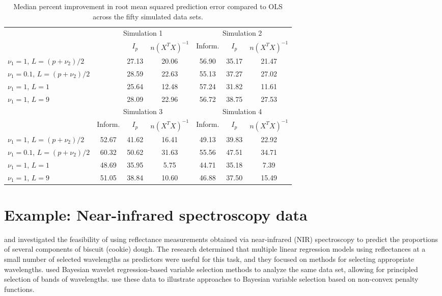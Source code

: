 \documentclass[12pt]{article}
\renewcommand{\baselinestretch}{1.85}
\begin{document}
\renewcommand{\baselinestretch}{1}
\begin{table}
	\begin{center}
\begin{tabular}{lcccccc}
  \toprule
  & \multicolumn{3}{c}{Simulation 1} & \multicolumn{3}{c}{Simulation 2} \\
  \cmidrule(lr){2-4} \cmidrule(lr){5-7} 
   &  & $I_p$ & $n(X^TX)^{-1}$ & Inform. & $I_p$ & $n(X^TX)^{-1}$ \\
  \midrule
$\nu_1=1$, $L=(p + \nu_2)/2$ & & 27.13 & 20.06 & 56.90 & 35.17 & 21.47\\
\hline
$\nu_1=0.1$, $L=(p + \nu_2)/2$ && 28.59 & 22.63 & 55.13 & 37.27 & 27.02\\
\hline
$\nu_1=1$, $L=1$ && 25.64 & 12.48 & 57.24 & 31.82 & 11.61\\
\hline
$\nu_1=1$, $L=9$ && 28.09 & 22.96 & 56.72 & 38.75 & 27.53\\
  \midrule
  & \multicolumn{3}{c}{Simulation 3} & \multicolumn{3}{c}{Simulation 4} \\
  \cmidrule(lr){2-4} \cmidrule(lr){5-7} 
   & Inform. & $I_p$ & $n(X^TX)^{-1}$ & Inform. & $I_p$ & $n(X^TX)^{-1}$ \\
  \midrule
$\nu_1=1$, $L=(p + \nu_2)/2$ & 52.67 & 41.62 & 16.41 & 49.13 & 39.83 & 22.92\\
\hline
$\nu_1=0.1$, $L=(p + \nu_2)/2$ & 60.32 & 50.62 & 31.63 & 55.56 & 47.51 & 34.71\\
\hline
$\nu_1=1$, $L=1$ & 48.69 & 35.95 & 5.75 & 44.71 & 35.18 & 7.39\\
\hline
$\nu_1=1$, $L=9$ & 51.05 & 38.84 & 10.60 & 46.88 & 37.50 & 15.49\\
  \bottomrule
\end{tabular}
	\caption{Median percent improvement in root mean squared prediction error
	compared to OLS across the fifty simulated data sets.\label{tab:relsim}}
\end{center}
\end{table}
\renewcommand{\baselinestretch}{1.85}


\section{Example: Near-infrared spectroscopy data}\label{sec:examp}
\citet{osbo:83} and \citet{osbo:84} investigated the feasibility of using 
reflectance measurements obtained via near-infrared (NIR) spectroscopy to 
predict the proportions of several components of biscuit (cookie) 
dough. The research determined that multiple linear regression models using
reflectances at a small number of selected wavelengths as predictors were useful 
for this task, and they focused on methods for selecting appropriate wavelengths.
\citet{brow:01} used Bayesian wavelet regression-based variable selection
methods to analyze the same data set, allowing for principled selection of 
bands of wavelengths. \citet{grif:11} use these data to illustrate approaches
to Bayesian variable selection based on non-convex penalty functions.
\end{document}
